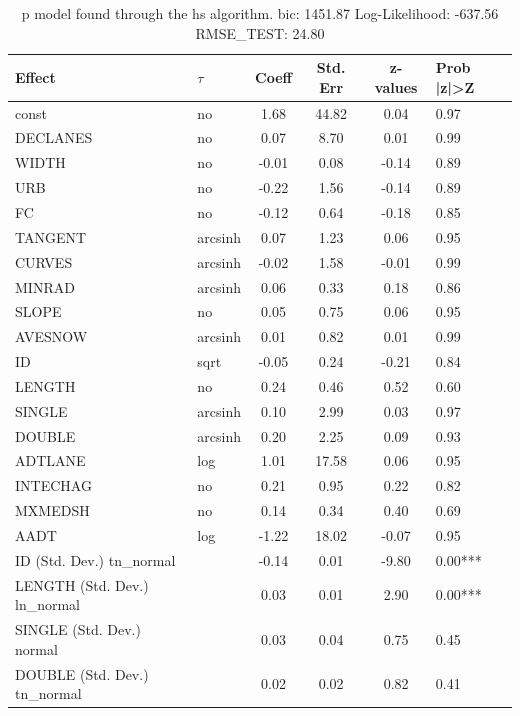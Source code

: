 \begin{table}
	\caption{p model found through the hs algorithm. bic: 1451.87 Log-Likelihood: -637.56 RMSE_TEST: 24.80}
	\begin{center}
		\begin{tabular}{|l|l|c|c|c|l|}
			\hline
			Effect & $\tau$ & Coeff & Std. Err & z-values & Prob |z|>Z \\
			\hline
			const & no & 1.68 & 44.82 & 0.04 & 0.97 \\
			\hline
			DECLANES & no & 0.07 & 8.70 & 0.01 & 0.99 \\
			\hline
			WIDTH & no & -0.01 & 0.08 & -0.14 & 0.89 \\
			\hline
			URB & no & -0.22 & 1.56 & -0.14 & 0.89 \\
			\hline
			FC & no & -0.12 & 0.64 & -0.18 & 0.85 \\
			\hline
			TANGENT & arcsinh & 0.07 & 1.23 & 0.06 & 0.95 \\
			\hline
			CURVES & arcsinh & -0.02 & 1.58 & -0.01 & 0.99 \\
			\hline
			MINRAD & arcsinh & 0.06 & 0.33 & 0.18 & 0.86 \\
			\hline
			SLOPE & no & 0.05 & 0.75 & 0.06 & 0.95 \\
			\hline
			AVESNOW & arcsinh & 0.01 & 0.82 & 0.01 & 0.99 \\
			\hline
			ID & sqrt & -0.05 & 0.24 & -0.21 & 0.84 \\
			\hline
			LENGTH & no & 0.24 & 0.46 & 0.52 & 0.60 \\
			\hline
			SINGLE & arcsinh & 0.10 & 2.99 & 0.03 & 0.97 \\
			\hline
			DOUBLE & arcsinh & 0.20 & 2.25 & 0.09 & 0.93 \\
			\hline
			ADTLANE & log & 1.01 & 17.58 & 0.06 & 0.95 \\
			\hline
			INTECHAG & no & 0.21 & 0.95 & 0.22 & 0.82 \\
			\hline
			MXMEDSH & no & 0.14 & 0.34 & 0.40 & 0.69 \\
			\hline
			AADT & log & -1.22 & 18.02 & -0.07 & 0.95 \\
			\hline
			ID (Std. Dev.) tn_normal &  & -0.14 & 0.01 & -9.80 & 0.00*** \\
			\hline
			LENGTH (Std. Dev.) ln_normal &  & 0.03 & 0.01 & 2.90 & 0.00*** \\
			\hline
			SINGLE (Std. Dev.) normal &  & 0.03 & 0.04 & 0.75 & 0.45 \\
			\hline
			DOUBLE (Std. Dev.) tn_normal &  & 0.02 & 0.02 & 0.82 & 0.41 \\

\end{tabular}
\end{center}
\end{table}
